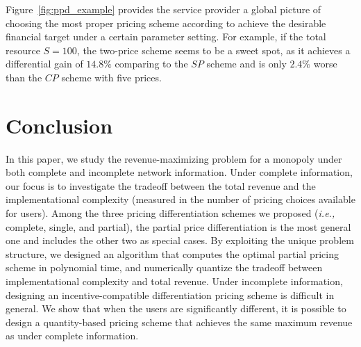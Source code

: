 \documentclass[twocolumn,10pt,twosided]{IEEEtran}
\newcommand{\ie}{\emph{i.e., }}
\begin{document}
Figure~\ref{fig:ppd_example} provides the service provider a global picture of choosing the most proper pricing scheme according to achieve the desirable financial target under a certain parameter setting.
For example, if the total resource $S=100$, the two-price
scheme seems to be a sweet spot, as it achieves a differential gain of $14.8\%$ comparing to the $SP$ scheme and is only $2.4\%$ worse than the $CP$ scheme with five prices.



\section{Conclusion}
In this paper, we study the revenue-maximizing problem for a
monopoly  under both complete and incomplete network information. Under complete information, our focus is to investigate the tradeoff between the  total revenue and the implementational complexity (measured in the number of pricing choices available for users). Among the three  pricing differentiation schemes we proposed (\ie complete,  single, and partial), the partial price differentiation is the most general one and includes the other two as special cases.
By exploiting the unique problem structure, we designed an algorithm that computes the optimal partial pricing scheme  in polynomial time, and numerically quantize the tradeoff between implementational complexity and total revenue.
Under incomplete information, designing an incentive-compatible  differentiation pricing scheme is difficult in general. We show that when the users are significantly different, it is possible to design a quantity-based pricing scheme that achieves the same maximum revenue as under complete information.
\end{document}
